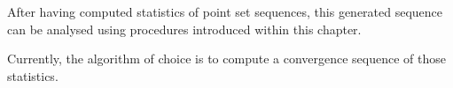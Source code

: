 %
After having computed statistics of point set sequences, this generated sequence can be analysed using procedures introduced within this chapter.

Currently, the algorithm of choice is to compute a convergence sequence of those statistics.
\clearpage
